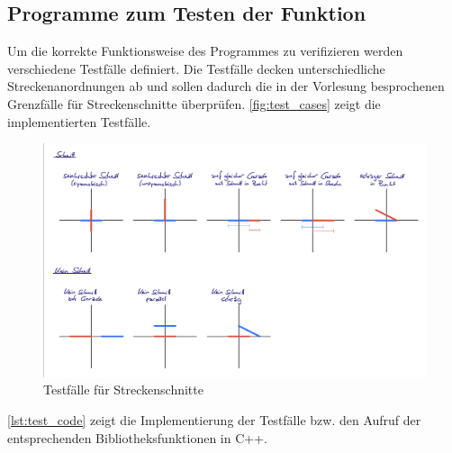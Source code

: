 \documentclass[12pt]{scrartcl}
\begin{document}
\subsection{Programme zum Testen der Funktion}
Um die korrekte Funktionsweise des Programmes zu verifizieren werden verschiedene Testfälle definiert.
Die Testfälle decken unterschiedliche Streckenanordnungen ab und sollen dadurch die in der Vorlesung besprochenen Grenzfälle für Streckenschnitte überprüfen.
\autoref{fig:test_cases} zeigt die implementierten Testfälle.


\begin{figure}[ht]
    \graphicspath{ {./pictures/} }
    \centering
    \includegraphics[scale=0.2]{Test_Vorlage.jpeg}
    \smallskip
    \caption{Testfälle für Streckenschnitte}
    \label{fig:test_cases}
\end{figure}

\autoref{lst:test_code} zeigt die Implementierung der Testfälle bzw. den Aufruf der entsprechenden Bibliotheksfunktionen in C++.\\
\end{document}
